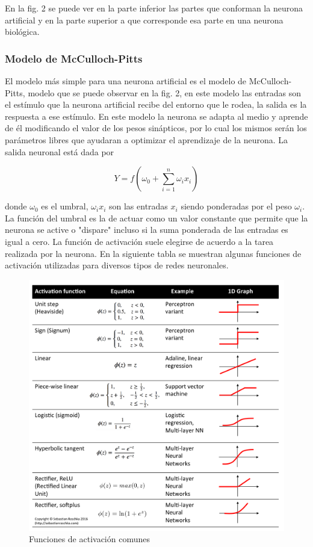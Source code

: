 En la fig. 2 se puede ver en la parte inferior las partes que conforman la neurona artificial y en la parte superior a que corresponde esa parte en una neurona biológica.

\subsubsection{Modelo de McCulloch-Pitts}

El modelo más simple para una neurona artificial es el modelo de McCulloch-Pitts, modelo que se puede observar en la fig. 2, en este modelo las entradas son el estímulo que la neurona artificial recibe del entorno que le rodea, la salida es la respuesta a ese estímulo. En este modelo la neurona se adapta al medio y aprende de él modificando el valor de los pesos sinápticos, por lo cual los mismos serán los parámetros libres que ayudaran a optimizar el aprendizaje de la neurona. La salida neuronal está dada por 

\begin{equation}
Y=f( \omega_0 + \sum_{i=1}^n \omega_i x_i )
\end{equation}

donde $\omega_0$ es el umbral, $\omega_i x_i$ son las entradas $x_i$ siendo ponderadas por el peso $\omega_i$. La función del umbral es la de actuar como un valor constante que permite que la neurona se active o "dispare" incluso si la suma ponderada de las entradas es igual a cero. La función de activación suele elegirse de acuerdo a la tarea realizada por la neurona. En la siguiente tabla se muestran algunas funciones de activación utilizadas para diversos tipos de redes neuronales. 

\begin{figure}[h!] %
		\centering	
		\includegraphics[scale=0.15]{activation-functions.png}
		\caption{Funciones de activación comunes}
\end{figure}

